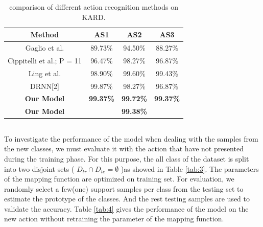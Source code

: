 \documentclass{bmvc2k}
\begin{document}
\begin{table}[htb]
	\begin{center}
		\scalebox{1.1}
		{
			\begin{tabular}{|c|c|c|c|}
				\hline
				Method & AS1 & AS2 & AS3 \\
				\hline\hline
				Gaglio et al. & 89.73\% & 94.50\%&88.27\%\\
				Cippitelli et al.; P = 11 & 96.47\% & 98.27\% & 96.87\%\\
				Ling et al. & 98.90\% & 99.60\% & 99.43\%\\
				DRNN[2] & 99.87\% & 98.27\% & 96.87\%\\
				\textbf{Our Model} & \textbf{99.37\%} & \textbf{99.72\%} & \textbf{99.37\%} \\
				\hline
				\textbf{Our Model} &  \multicolumn{3}{|c|}{\textbf{99.38\%}}\\
				\hline
			\end{tabular}
		}
	\end{center}
	\caption{ comparison of different action recognition methods on KARD. }
	\label{tab:2}
\end{table}

\subsection*{}
To investigate the performance of the model when dealing with the samples from the new classes, we must evaluate it with the action that have not presented during the training phase. For this purpose, the all class of the dataset is split into two disjoint sets ( $ D_{tr} \cap D_{te} = \emptyset $  )as showed in Table \ref{tab:3}. The parameters of the mapping function are optimized on training set. For evaluation, we randomly select a few(one) support samples per class from the testing set to estimate the prototype of the classes. And the rest testing samples are used to validate the accuracy. Table \ref{tab:4} gives the performance of the model on the new action without retraining the parameter of the mapping function. 
\end{document}
